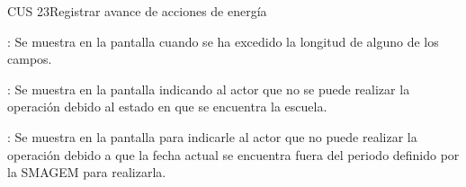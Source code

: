 \begin{UseCase}{CUS 23}{Registrar avance de acciones de energía}
{\begin{UClist}
	    \UCli {}: Se muestra en la pantalla  cuando se ha excedido la longitud de alguno de los campos.	
	    
	    \UCli  {}: Se muestra en la pantalla  indicando al actor que no se puede realizar la operación debido al estado en que se encuentra la escuela.
	    
	    \UCli {}: Se muestra en la pantalla  para indicarle al actor que no puede realizar la operación debido a que la fecha actual se encuentra fuera del periodo definido por la SMAGEM para realizarla.
	\end{UClist}
    }

    


\end{UseCase}


